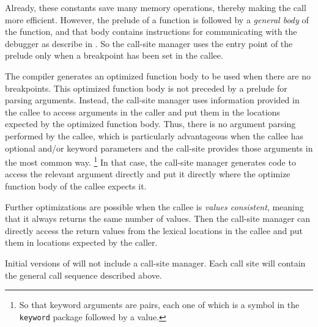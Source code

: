 Already, these constants save many memory operations, thereby making
the call more efficient.  However, the prelude of a function is
followed by a \emph{general body} of the function, and that body
contains instructions for communicating with the debugger as describe
in .  So the call-site manager uses the entry
point of the prelude only when a breakpoint has been set in the
callee.

The compiler generates an optimized function body to be used when
there are no breakpoints.  This optimized function body is not
preceded by a prelude for parsing arguments.  Instead, the call-site
manager uses information provided in the callee to access arguments in
the caller and put them in the locations expected by the optimized
function body.  Thus, there is no argument parsing performed by the
callee, which is particularly advantageous when the callee has
optional and/or keyword parameters and the call-site provides those
arguments in the most common way.%
\footnote{So that keyword arguments are pairs, each one of which is a
  symbol in the \texttt{keyword} package followed by a value.}
In that case, the call-site manager generates code to access the
relevant argument directly and put it directly where the optimize
function body of the callee expects it.

Further optimizations are possible when the callee is \emph{values
  consistent}, meaning that it always returns the same number of
values.  Then the call-site manager can directly access the return
values from the lexical locations in the callee and put them in
locations expected by the caller.

Initial versions of \sysname{} will not include a call-site manager.
Each call site will contain the general call sequence described
above.

